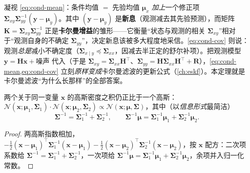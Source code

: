 \begin{insight}
凝视 \cref{eq:cond-mean}：条件均值 $=$ 先验均值 $\boldsymbol{\mu}_x$ \emph{加上}一个修正项 $\boldsymbol{\Sigma}_{xy}\boldsymbol{\Sigma}_{yy}^{-1}(\mathbf{y}-\boldsymbol{\mu}_y)$。其中 $(\mathbf{y}-\boldsymbol{\mu}_y)$ 是\textbf{新息}（观测减去其先验预测），而矩阵 $\mathbf{K}=\boldsymbol{\Sigma}_{xy}\boldsymbol{\Sigma}_{yy}^{-1}$ 正是\textbf{卡尔曼增益}的雏形——它衡量“状态与观测的相关 $\boldsymbol{\Sigma}_{xy}$”相对于“观测自身的不确定 $\boldsymbol{\Sigma}_{yy}$”，决定新息该被多大程度地采信。\cref{eq:cond-cov} 则说：观测\emph{总是}减小不确定度（$\boldsymbol{\Sigma}_{x\mid y}\preceq\boldsymbol{\Sigma}_{xx}$，因减去半正定的舒尔补项）。把观测模型 $\mathbf{y}=\mathbf{H}\mathbf{x}+\text{噪声}$ 代入（于是 $\boldsymbol{\Sigma}_{xy}=\boldsymbol{\Sigma}_{xx}\mathbf{H}^\top$、$\boldsymbol{\Sigma}_{yy}=\mathbf{H}\boldsymbol{\Sigma}_{xx}\mathbf{H}^\top+\mathbf{R}$），\cref{eq:cond-mean,eq:cond-cov} 立刻\emph{原样变成}卡尔曼滤波的更新公式（\cref{ch:eskf}）。本定理就是卡尔曼滤波“为什么长那样”的全部答案。
\end{insight}

\begin{theorem}\label{thm:gauss-product}
两个关于同一变量 $\mathbf{x}$ 的高斯密度之积仍正比于一个高斯：$\mathcal{N}(\mathbf{x};\boldsymbol{\mu}_1,\boldsymbol{\Sigma}_1)\cdot\mathcal{N}(\mathbf{x};\boldsymbol{\mu}_2,\boldsymbol{\Sigma}_2)\propto\mathcal{N}(\mathbf{x};\boldsymbol{\mu},\boldsymbol{\Sigma})$，其中（以\emph{信息形式}最简洁）
\begin{equation}
  \boldsymbol{\Sigma}^{-1}=\boldsymbol{\Sigma}_1^{-1}+\boldsymbol{\Sigma}_2^{-1},
  \qquad
  \boldsymbol{\Sigma}^{-1}\boldsymbol{\mu}=\boldsymbol{\Sigma}_1^{-1}\boldsymbol{\mu}_1+\boldsymbol{\Sigma}_2^{-1}\boldsymbol{\mu}_2.
  \label{eq:gauss-product}
\end{equation}
\end{theorem}
\begin{proof}
两高斯指数相加，$-\tfrac12(\mathbf{x}-\boldsymbol{\mu}_1)^\top\boldsymbol{\Sigma}_1^{-1}(\mathbf{x}-\boldsymbol{\mu}_1)-\tfrac12(\mathbf{x}-\boldsymbol{\mu}_2)^\top\boldsymbol{\Sigma}_2^{-1}(\mathbf{x}-\boldsymbol{\mu}_2)$，按 $\mathbf{x}$ 配方：二次项系数给 $\boldsymbol{\Sigma}^{-1}=\boldsymbol{\Sigma}_1^{-1}+\boldsymbol{\Sigma}_2^{-1}$，一次项给 $\boldsymbol{\Sigma}^{-1}\boldsymbol{\mu}=\boldsymbol{\Sigma}_1^{-1}\boldsymbol{\mu}_1+\boldsymbol{\Sigma}_2^{-1}\boldsymbol{\mu}_2$，余项并入归一化常数。
\end{proof}


